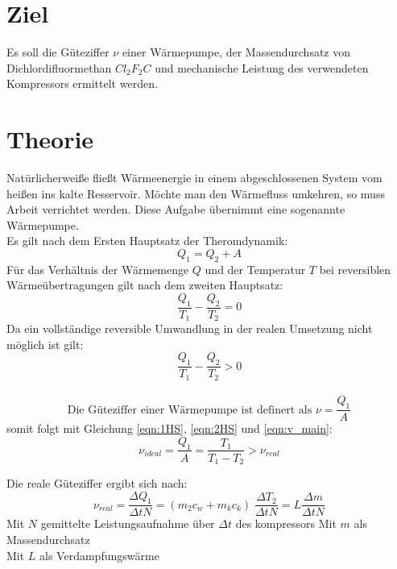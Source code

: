\newpage

\section*{Ziel}
    Es soll die Güteziffer $\nu$ einer Wärmepumpe, der Massendurchsatz 
    von Dichlordifluormethan $Cl_2F_2C$ und mechanische Leistung des verwendeten
    Kompressors ermittelt werden.
\section{Theorie}  
\label{sec:theorie}
    Natürlicherweiße fließt Wärmeenergie in einem abgeschlossenen
    System vom heißen ins kalte Resservoir.
    Möchte man den Wärmefluss umkehren, so muss Arbeit verrichtet werden.
    Diese Aufgabe übernimmt eine sogenannte Wärmepumpe.\\
    Es gilt nach dem Ersten Hauptsatz der Theromdynamik:
    \begin{equation}
        Q_1=Q_2+A
        \label{eqn:1HS}
    \end{equation}
    Für das Verhältnis der Wärmemenge $Q$ und der Temperatur $T$ bei reversiblen
    Wärmeübertragungen gilt nach dem zweiten Hauptsatz:
    \begin{equation}
        \frac{Q_1}{T_1}-\frac{Q_2}{T_2}=0
        \label{eqn:2HS}
    \end{equation}
    Da ein vollständige reversible Umwandlung in der realen Umsetzung 
    nicht möglich ist gilt:
    \begin{equation*}
        \frac{Q_1}{T_1}-\frac{Q_2}{T_2}>0
    \end{equation*}\\

    \begin{equation}
        \text{Die Güteziffer einer Wärmepumpe ist definert als } \nu=\frac{Q_1}{A}
        \label{eqn:v_main}
    \end{equation}
    somit folgt mit Gleichung \eqref{eqn:1HS}, \eqref{eqn:2HS} und \eqref{eqn:v_main}:
    \begin{equation}
        \nu_{ideal}=\frac{Q_1}{A}=\frac{T_1}{T_1-T_2}>\nu_{real}
    \end{equation}

    Die reale Güteziffer ergibt sich nach:
    \begin{equation}
        \nu_{real}=\frac{\Delta Q_1}{\Delta tN}=(m_2c_w + m_kc_k)\;\frac{\Delta T_2}{\Delta tN}=L\frac{\Delta m}{\Delta tN}     
    \end{equation}
        Mit $N$ gemittelte Leistungsaufnahme über $\Delta t$ des kompressors \newline
        Mit $m$ als Massendurchsatz\\
        Mit $L$ als Verdampfungswärme


